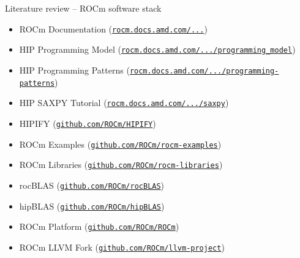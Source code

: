 \documentclass[aspectratio=43,9pt]{beamer}
\begin{document}
\begin{frame}{Literature review -- ROCm software stack}
\begin{itemize}
    \item ROCm Documentation (\href{https://rocm.docs.amd.com/}{\texttt{rocm.docs.amd.com/...}})
    \item HIP Programming Model (\href{https://rocm.docs.amd.com/projects/HIP/en/latest/understand/programming_model.html}{\texttt{rocm.docs.amd.com/.../programming\_model}})
    \item HIP Programming Patterns (\href{https://rocm.docs.amd.com/projects/HIP/en/latest/tutorial/programming-patterns.html}{\texttt{rocm.docs.amd.com/.../programming-patterns}})
    \item HIP SAXPY Tutorial (\href{https://rocm.docs.amd.com/projects/HIP/en/latest/tutorial/saxpy.html}{\texttt{rocm.docs.amd.com/.../saxpy}})
    \item HIPIFY (\href{https://github.com/ROCm/HIPIFY}{\texttt{github.com/ROCm/HIPIFY}})
    \item ROCm Examples (\href{https://github.com/ROCm/rocm-examples}{\texttt{github.com/ROCm/rocm-examples}})
    \item ROCm Libraries (\href{https://github.com/ROCm/rocm-libraries}{\texttt{github.com/ROCm/rocm-libraries}})
    \item rocBLAS (\href{https://github.com/ROCm/rocBLAS}{\texttt{github.com/ROCm/rocBLAS}})
    \item hipBLAS (\href{https://github.com/ROCm/hipBLAS}{\texttt{github.com/ROCm/hipBLAS}})
    \item ROCm Platform (\href{https://github.com/ROCm/ROCm}{\texttt{github.com/ROCm/ROCm}})
    \item ROCm LLVM Fork (\href{https://github.com/ROCm/llvm-project}{\texttt{github.com/ROCm/llvm-project}})
\end{itemize}
\end{frame}
\end{document}
